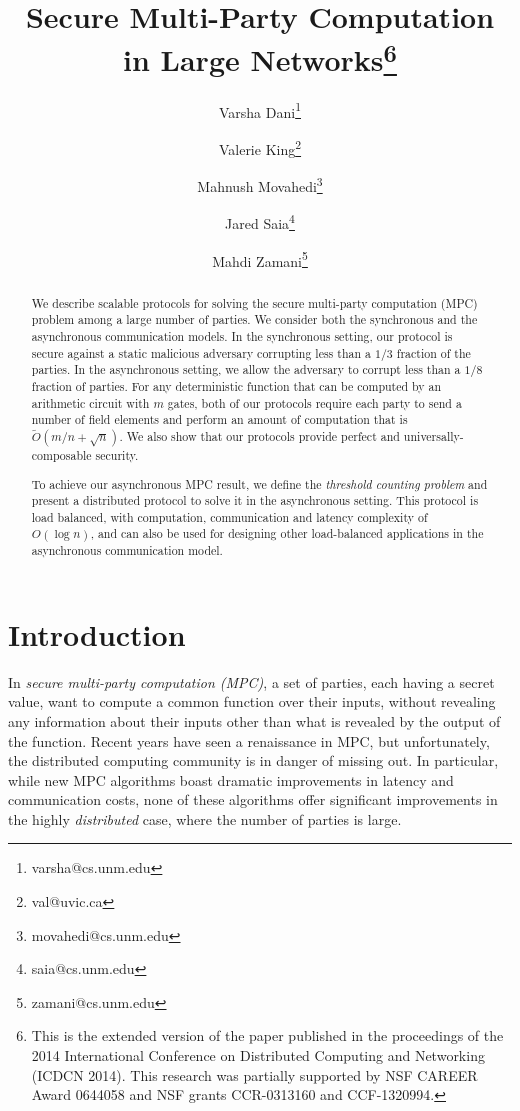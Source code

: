 \documentclass[11pt,letter]{article}
\author[1]{\normalsize Varsha Dani\thanks{varsha@cs.unm.edu}}
\author[2]{Valerie King\thanks{val@uvic.ca}}
\author[1]{Mahnush Movahedi\thanks{movahedi@cs.unm.edu}}
\author[1]{Jared Saia\thanks{saia@cs.unm.edu}}
\author[1]{Mahdi Zamani\thanks{zamani@cs.unm.edu}}
\affil[1]{Department of Computer Science, University of New Mexico, Albuquerque, NM, USA\vspace{3pt}}
\affil[2]{Department of Computer Science, University of Victoria, Victoria, BC, Canada}
\theoremstyle{mytheoremstyle}
\newcommand{\papertitle}{Secure Multi-Party Computation in Large Networks}
\begin{document}
\title{\papertitle\thanks{This is the extended version of the paper published in the proceedings of the 2014 International Conference on Distributed Computing and Networking (ICDCN 2014). This research was partially supported by NSF CAREER Award 0644058 and NSF grants CCR-0313160 and CCF-1320994.}}


\sloppy		

\maketitle
\begin{abstract}
We describe scalable protocols for solving the secure multi-party computation (MPC) problem among a large number of parties. We consider both the synchronous and the asynchronous communication models. In the synchronous setting, our protocol is secure against a static malicious adversary corrupting less than a $1/3$ fraction of the parties. In the asynchronous setting, we allow the adversary to corrupt less than a $1/8$ fraction of parties. For any deterministic function that can be computed by an arithmetic circuit with $m$ gates, both of our protocols require each party to send a number of field elements and perform an amount of computation that is $\tilde{O}(m/n + \sqrt n)$. We also show that our protocols provide perfect and universally-composable security.

\vspace{-1pt}
To achieve our asynchronous MPC result, we define the \emph{threshold counting problem} and present a distributed protocol to solve it in the asynchronous setting. This protocol is load balanced, with computation, communication and latency complexity of $O(\log{n})$, and can also be used for designing other load-balanced applications in the asynchronous communication model.
\end{abstract}

\section{Introduction}
In \emph{secure multi-party computation (MPC)}, a set of parties, each having a secret value, want to compute a common function over their inputs, without revealing any information about their inputs other than what is revealed by the output of the function.
Recent years have seen a renaissance in MPC, but unfortunately, the distributed computing community is in danger of missing out. In particular, while new MPC algorithms boast dramatic improvements in latency and communication costs, none of these algorithms offer significant improvements in the highly \emph{distributed} case, where the number of parties is large.
\end{document}
